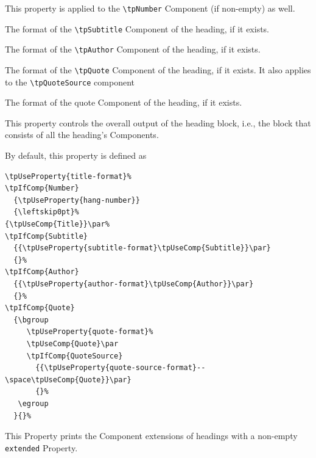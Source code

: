 This property is applied to the \lstinline{\tpNumber} Component (if
non-empty) as well.


The format of the \lstinline{\tpSubtitle} Component of the heading, if it exists.


The format of the \lstinline{\tpAuthor} Component of the heading, if it exists.


The format of the \lstinline{\tpQuote} Component of the heading, if it exists. It
also applies to the \lstinline{\tpQuoteSource} component


The format of the quote Component of the heading, if it exists.\Hack{\newpage}


This property controls the overall output of the heading block, i.e.,
the block that consists of all the heading's Components.

By default, this property is defined as
\begin{lstlisting}[style=tex]
\tpUseProperty{title-format}%
\tpIfComp{Number}
  {\tpUseProperty{hang-number}}
  {\leftskip0pt}%
{\tpUseComp{Title}}\par%
\tpIfComp{Subtitle}
  {{\tpUseProperty{subtitle-format}\tpUseComp{Subtitle}}\par}
  {}%
\tpIfComp{Author}
  {{\tpUseProperty{author-format}\tpUseComp{Author}}\par}
  {}%
\tpIfComp{Quote}
  {\bgroup
     \tpUseProperty{quote-format}%
     \tpUseComp{Quote}\par
     \tpIfComp{QuoteSource}
       {{\tpUseProperty{quote-source-format}--\space\tpUseComp{Quote}}\par}
       {}%
   \egroup
  }{}%
\end{lstlisting}


This Property prints the Component extensions of headings with a
non-empty \lstinline{extended} Property.

